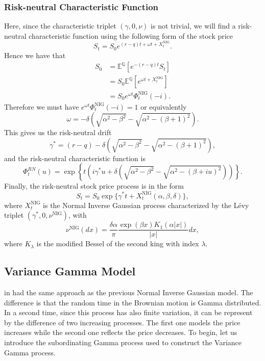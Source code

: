 \subsubsection*{Risk-neutral Characteristic Function}
Here, since the characteristic triplet $(\gamma,0,\nu)$ is not trivial, we will find a risk-neutral characteristic function using the following form of the stock price
$$S_t=S_0 e^{(r-q)t+\omega t +X_t^\text{NIG}}.$$
Hence we have that
\begin{align*}
S_0&=\mathbb{E}^\mathbb{Q}\left[e^{-(r-q)t}S_t\right]\\
&=S_0\mathbb{E}^\mathbb{Q}\left[e^{\omega t + X^\text{NIG}_t}\right]\\
&=S_0e^{\omega t}\Phi_t^\text{NIG}(-i).
\end{align*}
Therefore we must have $e^{\omega t}\Phi^\text{NIG}_t(-i) = 1$ or equivalently
$$\omega = - \delta \left(\sqrt{\alpha^2-\beta^2}-\sqrt{\alpha^2-(\beta+1)^2}\right).$$
This gives us the risk-neutral drift
$$\gamma^\ast=(r-q) -\delta \left(\sqrt{\alpha^2-\beta^2}-\sqrt{\alpha^2-(\beta+1)^2}\right),$$
and the risk-neutral characteristic function is
$$\Phi^{RN}_t(u) = \exp\left\{t\left(i\gamma^\ast u + \delta \left(\sqrt{\alpha^2-\beta^2}-\sqrt{\alpha^2-(\beta+iu)^2}\right)\right)\right\}.$$
Finally, the risk-neutral stock price process is in the form
$$S_t = S_0 \exp\{\gamma^\ast t + X_t^\text{NIG} (\alpha,\beta,\delta)\},$$
where $X_t^\text{NIG}$ is the Normal Inverse Gaussian process characterized by the L\'evy triplet $(\gamma^\ast,0,\nu^\text{NIG})$, with
$$\nu^\text{NIG}(dx) = \frac{\delta \alpha}{\pi}\frac{\exp(\beta x)K_1(\alpha|x|)}{|x|}dx,$$
where $K_\lambda$ is the modified Bessel of the second king with index $\lambda$.

\subsection{Variance Gamma Model}
\citeauthor{MCC98} in \citeyear{MCC98} had the same approach as the previous Normal Inverse Gaussian model. The difference is that the random time in the Brownian motion is Gamma distributed. In a second time, since this process has also finite variation, it can be represent by the difference of two increasing processes. The first one models the price increases while the second one reflects the price decreases. To begin, let us introduce the subordinating Gamma process used to construct the Variance Gamma process.

